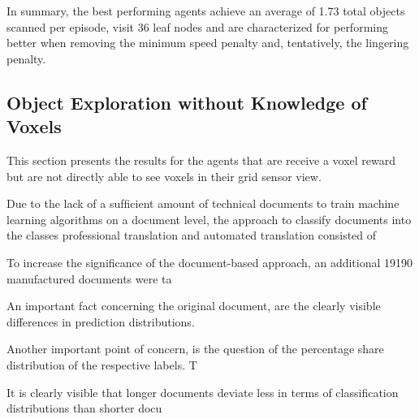         
        
        
        In summary, the best performing agents achieve an average of 1.73 total objects scanned per episode, visit 36 leaf nodes and are characterized for performing better when removing the minimum speed penalty and, tentatively, the lingering penalty.
    
    

    \subsection{Object Exploration without Knowledge of Voxels}
        
        This section presents the results for the agents that are receive a voxel reward but are not directly able to see voxels in their grid sensor view.
        
            
        Due to the lack of a sufﬁcient amount of technical documents to train machine learning
        algorithms on a document level, the approach to classify documents into the classes professional
        translation and automated translation consisted of 
        
        To increase the signiﬁcance of the document-based approach, an additional 19190 manufactured
        documents were ta
        
        An important fact concerning the original document, are the clearly visible differences in
        prediction distributions. 
        
        Another important point of concern, is the question of the percentage share distribution
        of the respective labels. T
        
        It is clearly visible that longer documents deviate less in terms of classiﬁcation distributions
        than shorter docu
        

